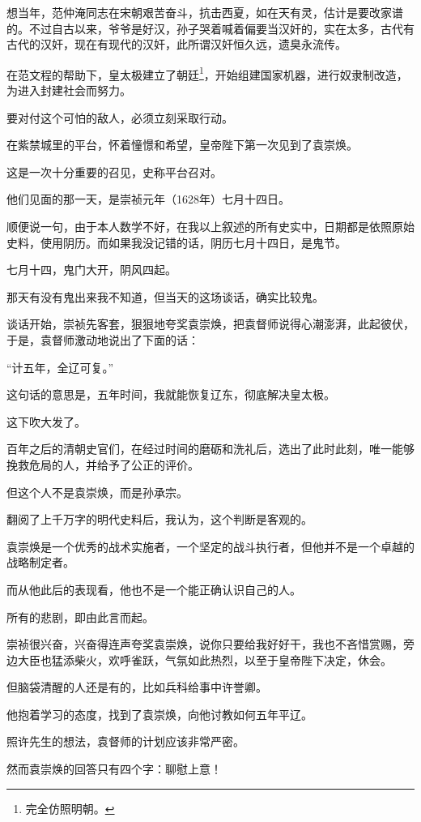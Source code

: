 \begin{multicols}{\theparacolNo}
		想当年，范仲淹同志在宋朝艰苦奋斗，抗击西夏，如在天有灵，估计是要改家谱的。不过自古以来，爷爷是好汉，孙子哭着喊着偏要当汉奸的，实在太多，古代有古代的汉奸，现在有现代的汉奸，此所谓汉奸恒久远，遗臭永流传。

		在范文程的帮助下，皇太极建立了朝廷\footnote{完全仿照明朝。}，开始组建国家机器，进行奴隶制改造，为进入封建社会而努力。

		要对付这个可怕的敌人，必须立刻采取行动。

		在紫禁城里的平台，怀着憧憬和希望，皇帝陛下第一次见到了袁崇焕。

		这是一次十分重要的召见，史称平台召对。

		他们见面的那一天，是崇祯元年（1628年）七月十四日。

		顺便说一句，由于本人数学不好，在我以上叙述的所有史实中，日期都是依照原始史料，使用阴历。而如果我没记错的话，阴历七月十四日，是鬼节。

		七月十四，鬼门大开，阴风四起。

		那天有没有鬼出来我不知道，但当天的这场谈话，确实比较鬼。

		谈话开始，崇祯先客套，狠狠地夸奖袁崇焕，把袁督师说得心潮澎湃，此起彼伏，于是，袁督师激动地说出了下面的话：

		“计五年，全辽可复。”

		这句话的意思是，五年时间，我就能恢复辽东，彻底解决皇太极。

		这下吹大发了。

		百年之后的清朝史官们，在经过时间的磨砺和洗礼后，选出了此时此刻，唯一能够挽救危局的人，并给予了公正的评价。

		但这个人不是袁崇焕，而是孙承宗。

		翻阅了上千万字的明代史料后，我认为，这个判断是客观的。

		袁崇焕是一个优秀的战术实施者，一个坚定的战斗执行者，但他并不是一个卓越的战略制定者。

		而从他此后的表现看，他也不是一个能正确认识自己的人。

		所有的悲剧，即由此言而起。

		崇祯很兴奋，兴奋得连声夸奖袁崇焕，说你只要给我好好干，我也不吝惜赏赐，旁边大臣也猛添柴火，欢呼雀跃，气氛如此热烈，以至于皇帝陛下决定，休会。

		但脑袋清醒的人还是有的，比如兵科给事中许誉卿。

		他抱着学习的态度，找到了袁崇焕，向他讨教如何五年平辽。

		照许先生的想法，袁督师的计划应该非常严密。

		然而袁崇焕的回答只有四个字：聊慰上意！


\end{multicols}
